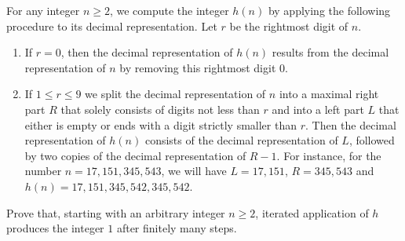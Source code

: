 For any integer $n \geq 2$, we compute the integer $h(n)$ by applying the following procedure to its decimal representation. Let $r$ be the rightmost digit of $n$.

\begin{enumerate}
\item[(1)] If $r = 0$, then the decimal representation of $h(n)$ results from the decimal representation of $n$ by removing this rightmost digit $0$.
\item[(2)] If $1 \leq r \leq 9$ we split the decimal representation of $n$ into a maximal right part $R$ that solely consists of digits not less than $r$ and into a left part $L$ that either is empty or ends with a digit strictly smaller than $r$. Then the decimal representation of $h(n)$ consists of the decimal representation of $L$, followed by two copies of the decimal representation of $R - 1$. For instance, for the number $n = 17{,}151{,}345{,}543$, we will have $L = 17{,}151$, $R = 345{,}543$ and $h(n) = 17{,}151{,}345{,}542{,}345{,}542$.
\end{enumerate}

Prove that, starting with an arbitrary integer $n \geq 2$, iterated application of $h$ produces the integer $1$ after finitely many steps.

